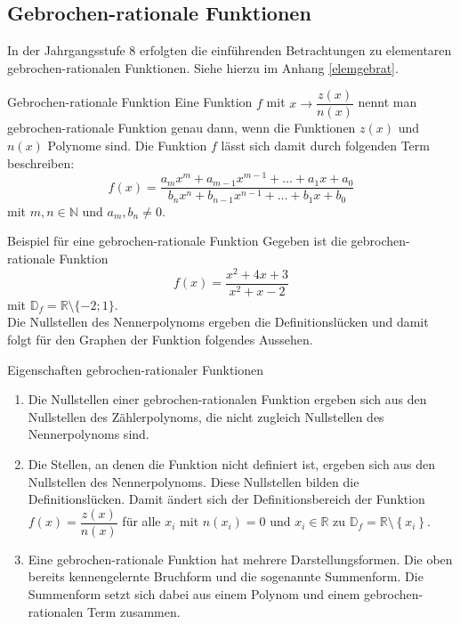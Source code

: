     \subsection{Gebrochen-rationale Funktionen}
In der Jahrgangsstufe 8 erfolgten die einführenden Betrachtungen zu elementaren gebrochen-rationalen Funktionen. Siehe hierzu im Anhang \ref{elemgebrat}.
 \begin{defi}{Gebrochen-rationale Funktion}{}
Eine Funktion $f$ mit $x\longrightarrow \dfrac{z(x)}{n(x)}$ nennt man gebrochen-rationale Funktion genau dann, wenn die Funktionen $z(x)$ und $n(x)$ Polynome sind. Die Funktion $f$ lässt sich damit durch folgenden Term beschreiben:$$f(x) = \dfrac{a_mx^m + a_{m-1}x^{m-1} + \ldots + a_1 x +a_0}{b_n x^n + b_{n-1}x^{n-1} + \ldots + b_1 x + b_0}$$ mit $m,n \in \mathds{N}$ und $a_m , b_n \neq 0$.
 \end{defi}
 \begin{bsp}{Beispiel für eine gebrochen-rationale Funktion}{} 
Gegeben ist die gebrochen-rationale Funktion  $$f(x)= \dfrac{x^2+4x+3}{x^2+x-2}$$ mit $\mathds{D}_f = \mathds{R}\setminus \{-2;1\}$. \\
Die Nullstellen des Nennerpolynoms ergeben die Definitionslücken und  damit folgt für den Graphen der Funktion folgendes Aussehen.
\begin{center}
\end{center}
\end{bsp}
 \begin{merke}{Eigenschaften gebrochen-rationaler Funktionen}{}
     \begin{enumerate}
         \item Die Nullstellen einer gebrochen-rationalen Funktion ergeben sich aus den Nullstellen des Zählerpolynoms, die nicht zugleich Nullstellen des Nennerpolynoms sind.
         \item Die Stellen, an denen die Funktion nicht definiert ist, ergeben sich aus den Nullstellen des Nennerpolynoms. Diese Nullstellen bilden die Definitionslücken. Damit ändert sich der Definitionsbereich der Funktion $f(x)= \dfrac{z(x)}{n(x)}$  für alle $x_i$ mit $n(x_i) = 0$ und $x_i \in \mathds{R}$ zu $\mathds{D}_f = \mathds{R}\setminus \left\{x_i\right\}$. 
     \item Eine gebrochen-rationale Funktion hat mehrere Darstellungsformen. Die oben bereits kennengelernte Bruchform und die sogenannte Summenform. Die Summenform setzt sich dabei aus einem Polynom und einem gebrochen-rationalen Term zusammen.
     \end{enumerate}
 \end{merke}
